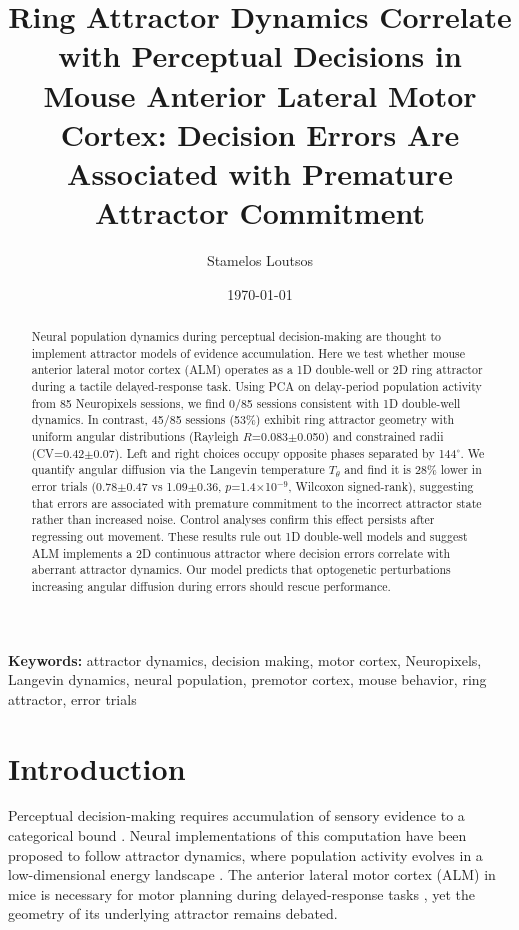 \documentclass[11pt,a4paper]{article}
\title{Ring Attractor Dynamics Correlate with Perceptual Decisions in Mouse Anterior Lateral Motor Cortex: Decision Errors Are Associated with Premature Attractor Commitment}
\author[1]{Stamelos Loutsos}
\date{\today}
\begin{document}
\maketitle

\begin{abstract}
Neural population dynamics during perceptual decision-making are thought to implement attractor models of evidence accumulation. Here we test whether mouse anterior lateral motor cortex (ALM) operates as a 1D double-well or 2D ring attractor during a tactile delayed-response task. Using PCA on delay-period population activity from 85 Neuropixels sessions, we find 0/85 sessions consistent with 1D double-well dynamics. In contrast, 45/85 sessions (53\%) exhibit ring attractor geometry with uniform angular distributions (Rayleigh \texorpdfstring{$R$}{R}=0.083$\pm$0.050) and constrained radii (CV=0.42$\pm$0.07). Left and right choices occupy opposite phases separated by 144\texorpdfstring{$^{\circ}$}{°}. We quantify angular diffusion via the Langevin temperature \texorpdfstring{$T_\theta$}{T_theta} and find it is 28\% lower in error trials (0.78$\pm$0.47 vs 1.09$\pm$0.36, \texorpdfstring{$p$}{p}=1.4$\times$10\texorpdfstring{$^{-9}$}{-9}, Wilcoxon signed-rank), suggesting that errors are associated with premature commitment to the incorrect attractor state rather than increased noise. Control analyses confirm this effect persists after regressing out movement. These results rule out 1D double-well models and suggest ALM implements a 2D continuous attractor where decision errors correlate with aberrant attractor dynamics. Our model predicts that optogenetic perturbations increasing angular diffusion during errors should rescue performance.
\end{abstract}

\textbf{Keywords:} attractor dynamics, decision making, motor cortex, Neuropixels, Langevin dynamics, neural population, premotor cortex, mouse behavior, ring attractor, error trials

\section{Introduction}

Perceptual decision-making requires accumulation of sensory evidence to a categorical bound \citep{gold2007neural,shinn2020alternative}. Neural implementations of this computation have been proposed to follow attractor dynamics, where population activity evolves in a low-dimensional energy landscape \citep{wang2002probabilistic,machens2005flexible,daie2021targeted}. The anterior lateral motor cortex (ALM) in mice is necessary for motor planning during delayed-response tasks \citep{guo2014flow,li2015robust,li2016robust}, yet the geometry of its underlying attractor remains debated.
\end{document}
